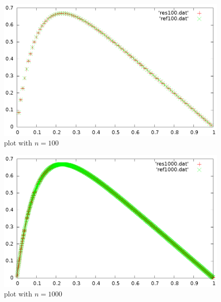 \documentclass[11pt,a4wide]{article}
\begin{document}
\begin{figure}[]
	\centering
		\includegraphics[scale=0.5,angle=-90]{plot100.eps}
	\caption{plot with $n=100$}
	\label{fig:plot100}
\end{figure}
\begin{figure}[]
	\centering
		\includegraphics[scale=0.5, angle=-90]{plot1000.eps}
	\caption{plot with $n=1000$}
	\label{fig:plot1000}
\end{figure}
\end{document}
